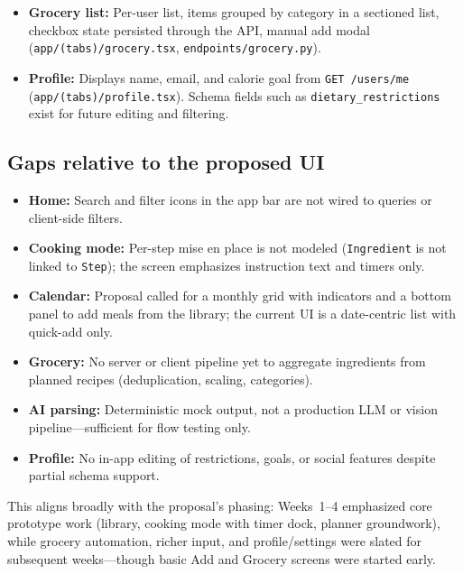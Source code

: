 \begin{itemize}[leftmargin=*]
  \item \textbf{Grocery list:} Per-user list, items grouped by category in a sectioned list, checkbox state persisted through the API, manual add modal (\texttt{app/(tabs)/grocery.tsx}, \texttt{endpoints/grocery.py}).
  \item \textbf{Profile:} Displays name, email, and calorie goal from \texttt{GET /users/me} (\texttt{app/(tabs)/profile.tsx}). Schema fields such as \texttt{dietary\_restrictions} exist for future editing and filtering.
\end{itemize}

\subsection{Gaps relative to the proposed UI}
\begin{itemize}[leftmargin=*]
  \item \textbf{Home:} Search and filter icons in the app bar are not wired to queries or client-side filters.
  \item \textbf{Cooking mode:} Per-step mise en place is not modeled (\texttt{Ingredient} is not linked to \texttt{Step}); the screen emphasizes instruction text and timers only.
  \item \textbf{Calendar:} Proposal called for a monthly grid with indicators and a bottom panel to add meals from the library; the current UI is a date-centric list with quick-add only.
  \item \textbf{Grocery:} No server or client pipeline yet to aggregate ingredients from planned recipes (deduplication, scaling, categories).
  \item \textbf{AI parsing:} Deterministic mock output, not a production LLM or vision pipeline---sufficient for flow testing only.
  \item \textbf{Profile:} No in-app editing of restrictions, goals, or social features despite partial schema support.
\end{itemize}

This aligns broadly with the proposal's phasing: Weeks~1--4 emphasized core prototype work (library, cooking mode with timer dock, planner groundwork), while grocery automation, richer input, and profile/settings were slated for subsequent weeks---though basic Add and Grocery screens were started early.

